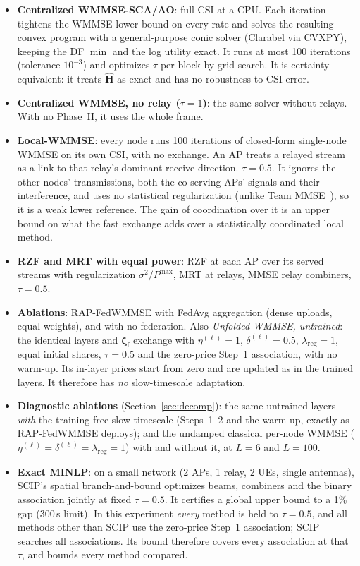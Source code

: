 \documentclass[conference]{IEEEtran}
\newcommand{\zf}{\boldsymbol{\zeta}_{\mathrm{f}}}
\begin{document}
\begin{itemize}
  \item \textbf{Centralized WMMSE-SCA/AO}: full CSI at a CPU. Each iteration
    tightens the WMMSE lower bound on every rate and solves the resulting
    convex program with a general-purpose conic solver (Clarabel via CVXPY),
    keeping the DF $\min$ and the log utility exact. It runs at most 100
    iterations (tolerance $10^{-3}$) and optimizes $\tau$ per block by grid
    search. It is certainty-equivalent: it treats $\hat{\mathbf{H}}$ as exact
    and has no robustness to CSI error.
  \item \textbf{Centralized WMMSE, no relay ($\tau=1$)}: the same solver
    without relays. With no Phase~II, it uses the whole frame.
  \item \textbf{Local-WMMSE}: every node runs 100 iterations of closed-form
    single-node WMMSE on its own CSI, with no exchange. An AP treats a
    relayed stream as a link to that relay's dominant receive direction.
    $\tau=0.5$. It ignores the other nodes' transmissions, both the
    co-serving APs' signals and their interference, and uses no statistical
    regularization (unlike Team
    MMSE~\cite{miretti2022team}), so it is a weak lower reference. The gain
    of coordination over it is an upper bound on what the fast exchange adds
    over a statistically coordinated local method.
  \item \textbf{RZF and MRT with equal power}: RZF at each AP over its served
    streams with regularization $\sigma^2/P^{\max}$, MRT at relays, MMSE
    relay combiners, $\tau=0.5$.
  \item \textbf{Ablations}: RAP-FedWMMSE with FedAvg aggregation (dense
    uploads, equal weights), and with no federation. Also
    \emph{Unfolded WMMSE, untrained}: the identical layers and $\zf$ exchange
    with $\eta^{(\ell)}=1$, $\delta^{(\ell)}=0.5$, $\lambda_{\mathrm{reg}}=1$,
    equal initial shares, $\tau=0.5$ and the zero-price Step~1 association,
    with no warm-up. Its in-layer prices start from zero and are updated as
    in the trained layers. It therefore has \emph{no} slow-timescale
    adaptation.
  \item \textbf{Diagnostic ablations} (Section~\ref{sec:decomp}): the same
    untrained layers \emph{with} the training-free slow timescale (Steps~1--2
    and the warm-up, exactly as RAP-FedWMMSE deploys); and the undamped
    classical per-node WMMSE ($\eta^{(\ell)}=\delta^{(\ell)}=
    \lambda_{\mathrm{reg}}=1$) with and without it, at $L=6$ and $L=100$.
  \item \textbf{Exact MINLP}: on a small network (2 APs, 1 relay, 2 UEs,
    single antennas), SCIP's spatial branch-and-bound
    \cite{bestuzheva2021scip} optimizes beams, combiners and the binary
    association jointly at fixed $\tau=0.5$. It certifies a global upper bound
    to a 1\% gap (300\,s limit). In this experiment \emph{every} method is held
    to $\tau=0.5$, and all methods other than SCIP use the zero-price Step~1
    association; SCIP searches all associations. Its bound therefore covers
    every association at that $\tau$, and bounds every method compared.
\end{itemize}
\end{document}
